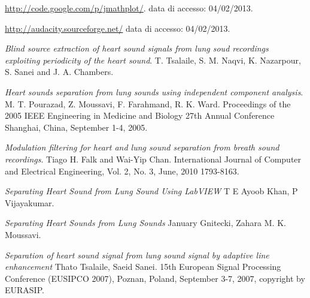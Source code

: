 \begin{thebibliography}{99}
  \url{http://code.google.com/p/jmathplot/}.
  data di accesso: 04/02/2013.

  \url{http://audacity.sourceforge.net/}
  data di accesso: 04/02/2013.


  \emph{Blind source extraction of heart sound signals from lung soud recordings exploiting periodicity of the heart sound}.
  T. Tsalaile, S. M. Naqvi, K. Nazarpour, S. Sanei and J. A. Chambers.

  \emph{Heart sounds separation from lung sounds using independent component analysis}.
  M. T. Pourazad, Z. Moussavi, F. Farahmand, R. K. Ward.
  Proceedings of the 2005 IEEE Engineering in Medicine and Biology 27th Annual Conference Shanghai, China, September 1-4, 2005.


  \emph{Modulation filtering for heart and lung sound separation from breath sound recordings}.
  Tiago H. Falk and Wai-Yip Chan.
  International Journal of Computer and Electrical Engineering, Vol. 2, No. 3, June, 2010 1793-8163.


  \emph{Separating Heart Sound from Lung Sound Using LabVIEW}
  T E Ayoob Khan, P Vijayakumar.


  \emph{Separating Heart Sounds from Lung Sounds}
  January Gnitecki, Zahara M. K. Moussavi.



  \emph{Separation of heart sound signal from lung sound signal by adaptive line enhancement}
  Thato Tsalaile, Saeid Sanei.
  15th European Signal Processing Conference (EUSIPCO 2007), Poznan, Poland, September 3-7, 2007, copyright by EURASIP.






\end{thebibliography}


